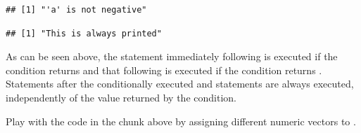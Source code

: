 \documentclass[krantz2]{krantz}\usepackage{knitr}%
\begin{document}
\begin{knitrout}\footnotesize
{}\color{fgcolor}\begin{kframe}
\begin{alltt}
 \hlkwb{<-} 
  \hlopt{<} \hlstd{)} \hlstd{(}\hlstd{)}  \hlstd{(}\hlstd{)}
\end{alltt}
\begin{verbatim}
## [1] "'a' is not negative"
\end{verbatim}
\begin{alltt}
\hlstd{(}\hlstd{)}
\end{alltt}
\begin{verbatim}
## [1] "This is always printed"
\end{verbatim}
\end{kframe}
\end{knitrout}

As can be seen above, the statement immediately following  is executed if the condition returns  and that following  is executed if the condition returns . Statements after the conditionally executed  and  statements are always executed, independently of the value returned by the condition.

\begin{playground}
Play with the code in the chunk above by assigning different numeric vectors to .
\end{playground}
\end{document}
